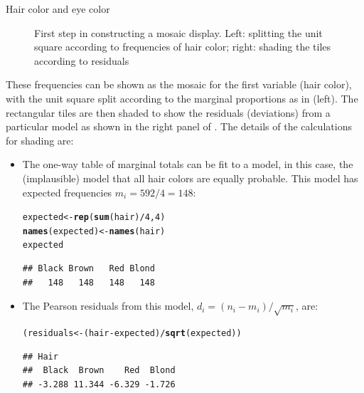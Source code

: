 \documentclass[11pt]{book}\usepackage[]{graphicx}\usepackage[]{color}
\makeatletter
\newcommand{\hlnum}[1]{\textcolor[rgb]{0.686,0.059,0.569}{#1}}%
\newcommand{\hlopt}[1]{\textcolor[rgb]{0,0,0}{#1}}%
\newcommand{\hlstd}[1]{\textcolor[rgb]{0.345,0.345,0.345}{#1}}%
\newcommand{\hlkwb}[1]{\textcolor[rgb]{0.69,0.353,0.396}{#1}}%
\newcommand{\hlkwd}[1]{\textcolor[rgb]{0.737,0.353,0.396}{\textbf{#1}}}%
\newenvironment{kframe}{%
 \def\at@end@of@kframe{}%
 \ifinner\ifhmode%
  \def\at@end@of@kframe{\end{minipage}}%
  \begin{minipage}{\columnwidth}%
 \fi\fi%
 \def\FrameCommand##1{\hskip\@totalleftmargin \hskip-\fboxsep
 \colorbox{shadecolor}{##1}\hskip-\fboxsep
     \hskip-\linewidth \hskip-\@totalleftmargin \hskip\columnwidth}%
 \MakeFramed {\advance\hsize-\width
   \@totalleftmargin\z@ \linewidth\hsize
   \@setminipage}}%
 {\par\unskip\endMakeFramed%
 \at@end@of@kframe}
\newenvironment{knitrout}{}{} %
\renewenvironment{knitrout}{\small\renewcommand{\baselinestretch}{.85}}{} %
\makeatother
\begin{document}
\begin{Example}[haireye2a]{Hair color and eye color}
\begin{knitrout}
\begin{figure}[htbp]
\caption[First step in constructing a mosaic display]{First step in constructing a mosaic display. Left: splitting the unit square according to frequencies of hair color; right: shading the tiles according to residuals\label{fig:haireye-mos4}}
\end{figure}


\end{knitrout}


These frequencies can be shown as the mosaic for the first variable (hair color),
with the unit square split according to the marginal proportions
as in  (left).
The rectangular tiles are then shaded to show the residuals (deviations)
from a particular model as shown in the right panel of .
The details of the calculations for shading are:

\begin{itemize}
\item The one-way table of marginal totals can be fit to a model, in this
case, the (implausible) model that all hair colors are equally probable.  This model
has expected frequencies $m_i = 592/4 = 148$:
\begin{knitrout}
\color{fgcolor}\begin{kframe}
\begin{alltt}
\hlstd{expected} \hlkwb{<-} \hlkwd{rep}\hlstd{(}\hlkwd{sum}\hlstd{(hair)}\hlopt{/}\hlnum{4}\hlstd{,} \hlnum{4}\hlstd{)}
\hlkwd{names}\hlstd{(expected)} \hlkwb{<-} \hlkwd{names}\hlstd{(hair)}
\hlstd{expected}
\end{alltt}
\begin{verbatim}
## Black Brown   Red Blond 
##   148   148   148   148
\end{verbatim}
\end{kframe}
\end{knitrout}

\item The Pearson residuals from this model, $d_i = ( n_i - m_i ) / \sqrt{m_i}$, are:
\begin{knitrout}
\color{fgcolor}\begin{kframe}
\begin{alltt}
\hlstd{(residuals} \hlkwb{<-} \hlstd{(hair} \hlopt{-} \hlstd{expected)} \hlopt{/} \hlkwd{sqrt}\hlstd{(expected))}
\end{alltt}
\begin{verbatim}
## Hair
##  Black  Brown    Red  Blond 
## -3.288 11.344 -6.329 -1.726
\end{verbatim}
\end{kframe}
\end{knitrout}


\end{itemize}
\end{Example}
\end{document}
